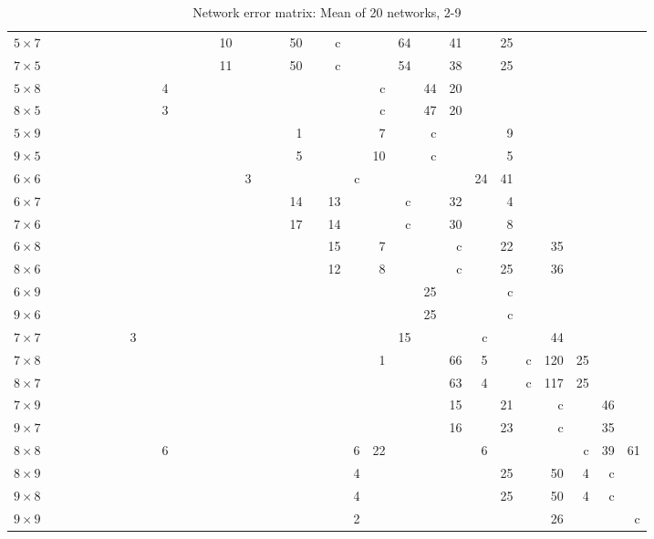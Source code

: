 \begin{table}
\begin{tabular}{l
rrrrrrrrrrrrrrrrrrrrrrrrrrrrrrr}
$5\times7$& & & & & & & & & & & & &10& & & &50& &c& & &64& &41& &25& & & & & \\
$7\times5$& & & & & & & & & & & & &11& & & &50& &c& & &54& &38& &25& & & & & \\
$5\times8$& & & & & & & & &4& & & & & & & & & & & &c& &44&20& & & & & & & \\
$8\times5$& & & & & & & & &3& & & & & & & & & & & &c& &47&20& & & & & & & \\
$5\times9$& & & & & & & & & & & & & & & & &1& & & &7& &c& & &9& & & & & \\
$9\times5$& & & & & & & & & & & & & & & & &5& & & &10& &c& & &5& & & & & \\
$6\times6$& & & & & & & & & & & & & &3& & & & & &c& & & & &24&41& & & & & \\
$6\times7$& & & & & & & & & & & & & & & & &14& &13& & &c& &32& &4& & & & & \\
$7\times6$& & & & & & & & & & & & & & & & &17& &14& & &c& &30& &8& & & & & \\
$6\times8$& & & & & & & & & & & & & & & & & & &15& &7& & &c& &22& &35& & & \\
$8\times6$& & & & & & & & & & & & & & & & & & &12& &8& & &c& &25& &36& & & \\
$6\times9$& & & & & & & & & & & & & & & & & & & & & & &25& & &c& & & & & \\
$9\times6$& & & & & & & & & & & & & & & & & & & & & & &25& & &c& & & & & \\
$7\times7$& & & & & & &3& & & & & & & & & & & & & & &15& & &c& & &44& & & \\
$7\times8$& & & & & & & & & & & & & & & & & & & & &1& & &66&5& &c&120&25& & \\
$8\times7$& & & & & & & & & & & & & & & & & & & & & & & &63&4& &c&117&25& & \\
$7\times9$& & & & & & & & & & & & & & & & & & & & & & & &15& &21& &c& &46& \\
$9\times7$& & & & & & & & & & & & & & & & & & & & & & & &16& &23& &c& &35& \\
$8\times8$& & & & & & & & &6& & & & & & & & & & &6&22& & & &6& & & &c&39&61\\
$8\times9$& & & & & & & & & & & & & & & & & & & &4& & & & & &25& &50&4&c& \\
$9\times8$& & & & & & & & & & & & & & & & & & & &4& & & & & &25& &50&4&c& \\
$9\times9$& & & & & & & & & & & & & & & & & & & &2& & & & & & & &26& & &c\\
\end{tabular}
\caption{Network error matrix: Mean of 20 networks, 2-9}
\label{neterr}
\end{table}

